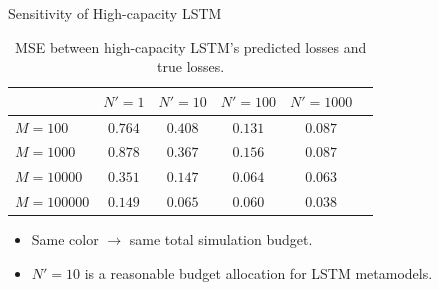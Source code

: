 \documentclass[9pt,handout]{beamer}
\begin{document}
\begin{frame}{Sensitivity of High-capacity LSTM}

    \begin{table}[ht!]
        \centering
        \begin{tabular}{lccccc}
            \toprule
            & $N'=1$ & $N'=10$  & $N'=100$ & $N'=1000$\\
            \midrule
            $M = 100$      & \textcolor{color10_2}{$0.764$} & \textcolor{color10_3}{$0.408$} & \textcolor{color10_4}{$0.131$} & \textcolor{color10_5}{$0.087$} \\
            $M = 1000$     & \textcolor{color10_3}{$0.878$} & \textcolor{color10_4}{$0.367$} & \textcolor{color10_5}{$0.156$} & \textcolor{color10_6}{$0.087$} \\
            $M = 10000$    & \textcolor{color10_4}{$0.351$} & \textcolor{color10_5}{$0.147$} & \textcolor{color10_6}{$0.064$} & \textcolor{color10_7}{$0.063$} \\
            $M = 100000$   & \textcolor{color10_5}{$0.149$} & \textcolor{color10_6}{$0.065$} & \textcolor{color10_7}{$0.060$} & \textcolor{color10_8}{$0.038$} \\
            \bottomrule
        \end{tabular}
        \caption{MSE between high-capacity LSTM's predicted losses and true losses.}
    \end{table}

    \begin{itemize}
        \item   Same color $\rightarrow$ same total simulation budget.
        \item   $N' = 10$ is a reasonable budget allocation for LSTM metamodels.
    \end{itemize}
    
\end{frame}
\end{document}

